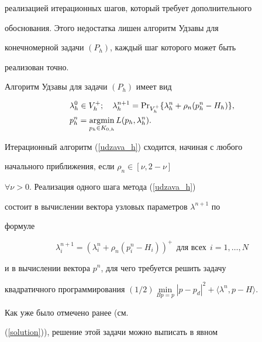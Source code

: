 реализацией итерационных шагов, который требует дополнительного


обоснования. Этого недостатка лишен алгоритм Удзавы для


конечномерной задачи $(P_h)$, каждый шаг которого может быть


реализован точно.


\medskip





Алгоритм Удзавы для задачи $(P_h)$ имеет вид


\begin{equation}\label {udzava_h}


\begin{split}


&\lambda_h^{0} \in V_h^{+};


\quad \lambda_h^{n+1}= \PR_{V_h^{+}}


\{\lambda_h^{n}+\rho_{n}(p_h^{n}-H_h)\},\\


&p_h^{n}= \argmin\limits_{p_h\in K_{0,h}} L(p_h,\lambda_h^{n}).


\end{split}


\end{equation}


Итерационный алгоритм (\ref{udzava_h}) сходится, начиная с любого


начального приближения, если $\rho_{n}\in [\nu, 2-\nu]$


$\forall \nu>0$. Реализация одного шага метода (\ref{udzava_h})


состоит в вычислении вектора узловых параметров $\lambda^{n+1}$ по


формуле


\begin{equation}\label{pro}


\lambda_i^{n+1}=(\lambda_i^{n}+\rho_{n}(p_i^{n}-H_i))^{+}\ \ 


\text{для всех} \ \ i=1,\dotsc,N


\end{equation}


и в вычислении вектора $p^{n}$, для чего требуется решить задачу


квадратичного программирования $(1/2)\min\limits_{Bp=p}


|p-p_d|^{2}+\langle \lambda^{n},p-H\rangle$.


Как уже было отмечено ранее (см.


(\ref{solution})), решение этой задачи можно выписать в явном


